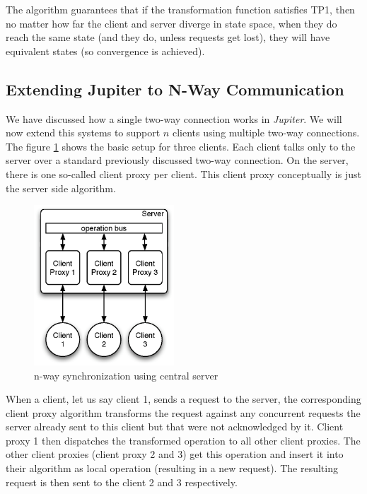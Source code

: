 The algorithm guarantees that if the transformation function satisfies TP1, then no matter how far the client and server diverge in state space, when they do reach the same state (and they do, unless requests get lost), they will have equivalent states (so convergence is achieved).



\subsection{Extending Jupiter to N-Way Communication}
We have discussed how a single two-way connection works in \emph{Jupiter}. We will now extend this systems to support $n$ clients using multiple two-way connections. The figure \ref{fig:concepts.nway-details} shows the basic setup for three clients. Each client talks only to the server over a standard previously discussed two-way connection. On the server, there is one so-called client proxy per client. This client proxy conceptually is just the server side algorithm. 

\begin{figure}[htb]
 \centering
 \includegraphics[width=5.23cm,height=6cm]{../../images/concepts_nway-details.eps}
 \caption{n-way synchronization using central server}
 \label{fig:concepts.nway-details}
\end{figure}

When a client, let us say client 1, sends a request to the server, the corresponding client proxy algorithm transforms the request against any concurrent requests the server already sent to this client but that were not acknowledged by it. Client proxy 1 then dispatches the transformed operation to all other client proxies. The other client proxies (client proxy 2 and 3) get this operation and insert it into their algorithm as local operation (resulting in a new request). The resulting request is then sent to the client 2 and 3 respectively. 

